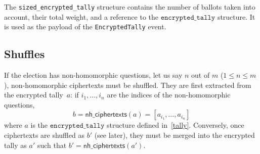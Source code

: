 \documentclass[a4paper]{article}
\newcommand{\etally}{\texttt{encrypted\_tally}}
\begin{document}
The \texttt{sized\_encrypted\_tally} structure contains the number of
ballots taken into account, their total weight, and a reference to the
$\etally$ structure. It is used as the payload of the
\texttt{EncryptedTally} event.

\subsection{Shuffles}
\label{shuffles}

If the election has non-homomorphic questions, let us say $n$ out of
$m$ ($1\leq n\leq m$), non-homomorphic ciphertexts must be
shuffled. They are first extracted from the encrypted tally~$a$: if
$i_1,\dots,i_n$ are the indices of the non-homomorphic questions,
\[
  b=\textsf{nh\_ciphertexts}(a)=[a_{i_1},\dots,a_{i_n}]
\]
where $a$ is the $\etally$ structure defined
in~\ref{tally}. Conversely, once ciphertexts are shuffled as $b'$ (see
later), they must be merged into the encrypted tally as $a'$ such that
$b'=\textsf{nh\_ciphertexts}(a')$.
\end{document}
